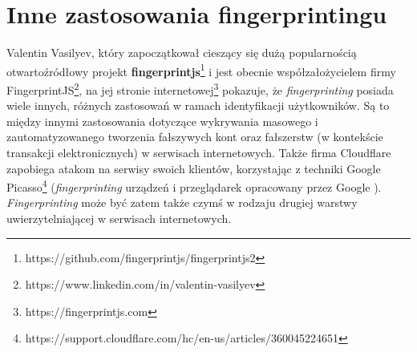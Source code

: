 \section{Inne zastosowania fingerprintingu}
Valentin Vasilyev, który zapoczątkował cieszący się dużą popularnością
otwartoźródłowy projekt
\textbf{fingerprintjs}\footnote{https://github.com/fingerprintjs/fingerprintjs2}
i jest obecnie współzałożycielem firmy
FingerprintJS\footnote{https://www.linkedin.com/in/valentin-vasilyev}, na jej
stronie internetowej\footnote{https://fingerprintjs.com} pokazuje, że
\emph{fingerprinting} posiada wiele innych, różnych zastosowań w ramach
identyfikacji użytkowników. Są to między innymi zastosowania dotyczące
wykrywania masowego i zautomatyzowanego tworzenia fałszywych kont oraz
fałszerstw (w kontekście transakcji elektronicznych) w serwisach internetowych.
Także firma Cloudflare zapobiega atakom na serwisy swoich klientów, korzystając
z techniki Google
Picasso\footnote{https://support.cloudflare.com/hc/en-us/articles/360045224651}
(\emph{fingerprinting} urządzeń i przeglądarek opracowany przez Google
\cite{45581}). \emph{Fingerprinting} może być zatem także czymś w rodzaju
drugiej warstwy uwierzytelniającej w serwisach internetowych.
